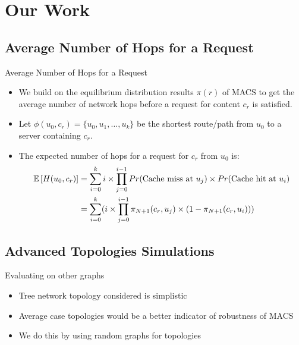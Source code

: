 \documentclass[
	xcolor={svgnames},
	hyperref={pagebackref,bookmarks},
	aspectratio=43,
]{beamer}
\begin{document}
\section{Our Work}

\subsection{Average Number of Hops for a Request}
\begin{frame}{Average Number of Hops for a Request}
    \begin{itemize}
        \item We build on the equilibrium distribution results $\pi(r)$ of MACS to get the average number of network hops before a request for content $c_r$ is satisfied.
        \item Let $\phi(u_0, c_r) = \lbrace u_0, u_1, \ldots , u_k \rbrace$ be the shortest route/path from $u_0$ to a server containing $c_r$.
        \item The expected number of hops for a request for $c_r$ from $u_0$ is:
        \begin{align}
            \mathbb{E} \left[ H(u_0, c_r) \right] &= \sum_{i=0}^{k} i \times \prod_{j = 0}^{i-1} Pr(\text{Cache miss at }u_j) \times Pr(\text{Cache hit at }u_i) \nonumber \\
            &= \sum_{i=0}^{k} (i \times \prod_{j = 0}^{i-1} \pi_{N+1}(c_r, u_j) \times (1 - \pi_{N+1}(c_r, u_i)))
        \end{align}
    \end{itemize}
\end{frame}

\subsection{Advanced Topologies Simulations}
\begin{frame}{Evaluating on other graphs}
    \begin{itemize}
        \item Tree network topology considered is simplistic
        \item Average case topologies would be a better indicator of robustness of MACS 
        \item We do this by using random graphs for topologies
    \end{itemize}
\end{frame}
\end{document}
